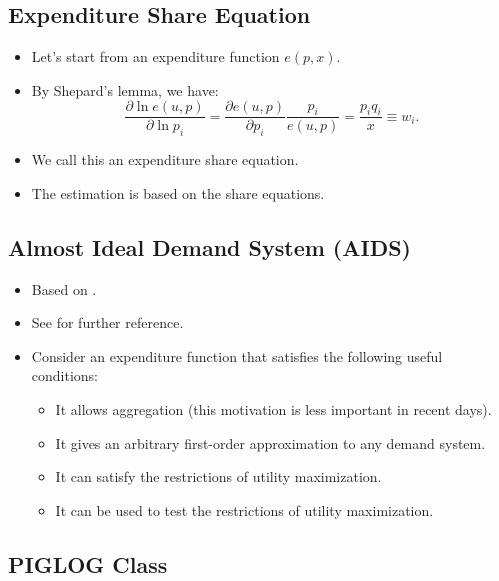 \documentclass[
]{book}
\providecommand{\tightlist}{%
  \setlength{\itemsep}{0pt}\setlength{\parskip}{0pt}}
\begin{document}
\hypertarget{expenditure-share-equation}{%
\subsection{Expenditure Share Equation}\label{expenditure-share-equation}}

\begin{itemize}
\tightlist
\item
  Let's start from an expenditure function \(e(p, x)\).
\item
  By Shepard's lemma, we have:
  \begin{equation}
  \frac{\partial \ln e(u, p)}{\partial \ln p_i} = \frac{\partial e(u, p)}{\partial p_i} \frac{p_i}{e(u, p)} = \frac{p_i q_i}{x} \equiv w_i.
  \end{equation}
\item
  We call this an expenditure share equation.
\item
  The estimation is based on the share equations.
\end{itemize}

\hypertarget{almost-ideal-demand-system-aids}{%
\subsection{Almost Ideal Demand System (AIDS)}\label{almost-ideal-demand-system-aids}}

\begin{itemize}
\tightlist
\item
  Based on \citet{Deaton1980}.
\item
  See \citet{AngusDeaton1980} for further reference.
\item
  Consider an expenditure function that satisfies the following useful conditions:

  \begin{itemize}
  \tightlist
  \item
    It allows aggregation (this motivation is less important in recent days).
  \item
    It gives an arbitrary first-order approximation to any demand system.
  \item
    It can satisfy the restrictions of utility maximization.
  \item
    It can be used to test the restrictions of utility maximization.
  \end{itemize}
\end{itemize}

\hypertarget{piglog-class}{%
\subsection{PIGLOG Class}\label{piglog-class}}
\end{document}
